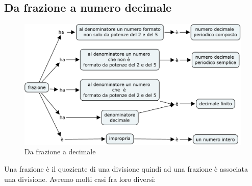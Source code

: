 \subsection{Da frazione a numero decimale}
\begin{figure}
	\centering
	\includegraphics[scale=0.8]{da_frazione_a_numero_decimale-crop}
	\caption{Da frazione a decimale}
	\label{fig:DaFrazioniaDecimale}
\end{figure}
Una frazione è il quoziente di una divisione quindi ad una frazione è associata una divisione. Avremo molti casi fra loro diversi:
